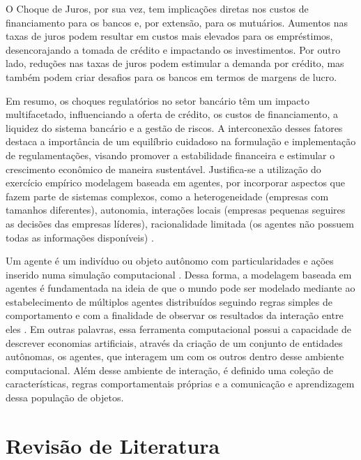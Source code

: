\documentclass[hidelinks, article,12pt,oneside,a4paper,english,brazil,sumario=tradicional]{abntex2}
\begin{document}
O Choque de Juros, por sua vez, tem implicações diretas nos custos de financiamento para os bancos e, por extensão, para os mutuários. Aumentos nas taxas de juros podem resultar em custos mais elevados para os empréstimos, desencorajando a tomada de crédito e impactando os investimentos. Por outro lado, reduções nas taxas de juros podem estimular a demanda por crédito, mas também podem criar desafios para os bancos em termos de margens de lucro.

Em resumo, os choques regulatórios no setor bancário têm um impacto multifacetado, influenciando a oferta de crédito, os custos de financiamento, a liquidez do sistema bancário e a gestão de riscos. A interconexão desses fatores destaca a importância de um equilíbrio cuidadoso na formulação e implementação de regulamentações, visando promover a estabilidade financeira e estimular o crescimento econômico de maneira sustentável. Justifica-se a utilização do exercício empírico modelagem baseada em agentes, por incorporar aspectos que fazem parte de sistemas complexos, como a heterogeneidade (empresas com tamanhos diferentes), autonomia, interações locais (empresas pequenas seguires as decisões das empresas líderes), racionalidade limitada (os agentes não possuem todas as informações disponíveis) \cite{miller2009complex} \cite{lima2014arcaboucco} \cite{putriani2020exploration} \cite{teixeira2016bank}. 

Um agente é um indivíduo ou objeto autônomo com particularidades e ações inserido numa simulação computacional \cite{wilensky2015introduction} \cite{alaliyat2019comparison}. Dessa forma, a modelagem baseada em agentes é fundamentada na ideia de que o mundo pode ser modelado mediante ao estabelecimento de múltiplos agentes distribuídos seguindo regras simples de comportamento e com a finalidade de observar os resultados da interação entre eles \cite{alaliyat2019comparison}. Em outras palavras, essa ferramenta computacional possui a capacidade de descrever economias artificiais, através da criação de um conjunto de entidades autônomas, os agentes, que interagem um com os outros dentro desse ambiente computacional. Além desse ambiente de interação, é definido uma coleção de características, regras comportamentais próprias e a comunicação e aprendizagem dessa população de objetos.  


\section{Revisão de Literatura}
\end{document}
